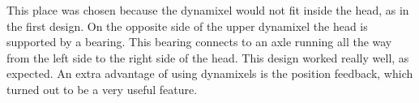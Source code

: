 \documentclass[technical_document.tex]{subfiles}
\begin{document}
This place was chosen because the dynamixel would not fit inside the head, as in the first design. On the opposite side of the upper dynamixel the head is supported by a bearing. This bearing connects to an axle running all the way from the left side to the right side of the head. This design worked really well, as expected. An extra advantage of using dynamixels is the position feedback, which turned out to be a very useful feature.
\end{document}
